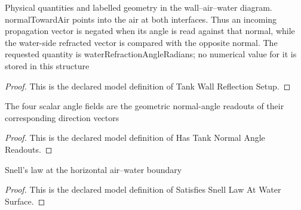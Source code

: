 \begin{definition}
  \label{def:physics:phyx-mini-0103:phyxminiproblems-problemphyxmini0103-tankwallreflectionsetup}
  Physical quantities and labelled geometry in the wall--air--water diagram. normalTowardAir points into the air at both interfaces. Thus an incoming propagation vector is negated when its angle is read against that normal, while the water-side refracted vector is compared with the opposite normal. The requested quantity is waterRefractionAngleRadians; no numerical value for it is stored in this structure
\end{definition}
\begin{proof}
  This is the declared model definition of Tank Wall Reflection Setup.
\end{proof}
\begin{definition}
  \label{def:physics:phyx-mini-0103:phyxminiproblems-problemphyxmini0103-hastanknormalanglereadouts}
  The four scalar angle fields are the geometric normal-angle readouts of their corresponding direction vectors
\end{definition}
\begin{proof}
  This is the declared model definition of Has Tank Normal Angle Readouts.
\end{proof}
\begin{definition}
  \label{def:physics:phyx-mini-0103:phyxminiproblems-problemphyxmini0103-satisfiessnelllawatwatersurface}
  Snell's law at the horizontal air--water boundary
\end{definition}
\begin{proof}
  This is the declared model definition of Satisfies Snell Law At Water Surface.
\end{proof}
